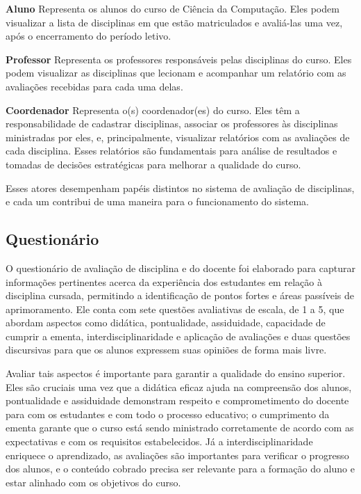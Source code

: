 \begin{alineas}
  \item \textbf{Aluno} Representa os alunos do curso de Ciência da Computação. Eles podem visualizar a lista de disciplinas em que estão matriculados e avaliá-las uma vez, após o encerramento do período letivo.
  \item \textbf{Professor} Representa os professores responsáveis pelas disciplinas do curso. Eles podem visualizar as disciplinas que lecionam e acompanhar um relatório com as avaliações recebidas para cada uma delas.
  \item \textbf{Coordenador} Representa o(s) coordenador(es) do curso. Eles têm a responsabilidade de cadastrar disciplinas, associar os professores às disciplinas ministradas por eles, e, principalmente, visualizar relatórios com as avaliações de cada disciplina. Esses relatórios são fundamentais para análise de resultados e tomadas de decisões estratégicas para melhorar a qualidade do curso.
\end{alineas}

Esses atores desempenham papéis distintos no sistema de avaliação de disciplinas, e cada um contribui de uma maneira para o funcionamento do sistema.

\subsection{Questionário}

 
O questionário de avaliação de disciplina e do docente foi elaborado para capturar informações pertinentes acerca da experiência dos estudantes em relação à disciplina cursada, permitindo a identificação de pontos fortes e áreas passíveis de aprimoramento. Ele conta com sete questões avaliativas de escala, de 1 a 5, que abordam aspectos como didática, pontualidade, assiduidade, capacidade de cumprir a ementa, interdisciplinaridade e aplicação de avaliações e duas questões discursivas para que os alunos expressem suas opiniões de forma mais livre.

Avaliar tais aspectos é importante para garantir a qualidade do ensino superior. Eles são cruciais uma vez que a didática eficaz ajuda na compreensão dos alunos, pontualidade e assiduidade demonstram respeito e comprometimento do docente para com os estudantes e com todo o processo educativo; o cumprimento da ementa garante que o curso está sendo ministrado corretamente de acordo com as expectativas e com os requisitos estabelecidos. Já a interdisciplinaridade enriquece o aprendizado, as avaliações são importantes para verificar o progresso dos alunos, e o conteúdo cobrado precisa ser relevante para a formação do aluno e estar alinhado com os objetivos do curso.


